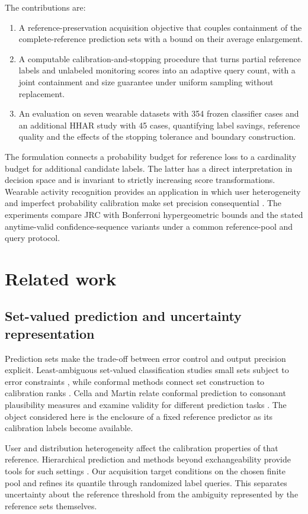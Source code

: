 \documentclass[preprint,12pt]{elsarticle}
\begin{document}
The contributions are:
\begin{enumerate}
\item A reference-preservation acquisition objective that couples containment of the complete-reference prediction sets with a bound on their average enlargement.
\item A computable calibration-and-stopping procedure that turns partial reference labels and unlabeled monitoring scores into an adaptive query count, with a joint containment and size guarantee under uniform sampling without replacement.
\item An evaluation on seven wearable datasets with 354 frozen classifier cases and an additional HHAR study with 45 cases, quantifying label savings, reference quality and the effects of the stopping tolerance and boundary construction.
\end{enumerate}
The formulation connects a probability budget for reference loss to a cardinality budget for additional candidate labels. The latter has a direct interpretation in decision space and is invariant to strictly increasing score transformations. Wearable activity recognition provides an application in which user heterogeneity and imperfect probability calibration make set precision consequential \cite{guo,ovadia}. The experiments compare JRC with Bonferroni hypergeometric bounds and the stated anytime-valid confidence-sequence variants under a common reference-pool and query protocol.

\section{Related work}
\subsection{Set-valued prediction and uncertainty representation}
Prediction sets make the trade-off between error control and output precision explicit. Least-ambiguous set-valued classification studies small sets subject to error constraints \cite{sadinle}, while conformal methods connect set construction to calibration ranks \cite{vovk,angelopoulos,romano}. Cella and Martin relate conformal prediction to consonant plausibility measures and examine validity for different prediction tasks \cite{cella2022}. The object considered here is the enclosure of a fixed reference predictor as its calibration labels become available.

User and distribution heterogeneity affect the calibration properties of that reference. Hierarchical prediction and methods beyond exchangeability provide tools for such settings \cite{dunn,barber}. Our acquisition target conditions on the chosen finite pool and refines its quantile through randomized label queries. This separates uncertainty about the reference threshold from the ambiguity represented by the reference sets themselves.
\end{document}
